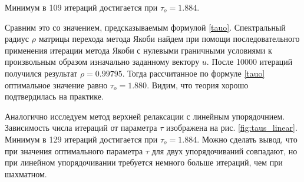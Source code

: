 \documentclass[report , a4paper, onecolumn, 12pt]{article}
\begin{document}
Минимум в 109 итераций достигается при $\tau_o = 1.884$. 

Сравним это со значением, предсказываемым формулой \ref{tauo}. Спектральный радиус $\rho$ матрицы перехода метода Якоби найдем при помощи последовательного применения итерации метода Якоби с нулевыми граничными условиями к произвольным образом изначально заданному вектору $u$. После 10000 итераций получился результат $\rho = 0.99795$. Тогда рассчитанное по формуле \ref{tauo} оптимальное значение равно $\tau_o = 1.880$. Видим, что теория хорошо подтвердилась на практике.

Аналогично исследуем метод верхней релаксации  с линейным упорядочнием.  Зависимость числа итераций от параметра $\tau$ изображена на рис. \ref{fig:taus_linear}. Минимум в 129 итераций достигается при $\tau_o=1.884$. Можно сделать вывод, что при значения оптимального параметра $\tau$ для двух упорядочиваний совпадают, но при линейном упорядочивании требуется немного больше итераций, чем при шахматном.
\end{document}
